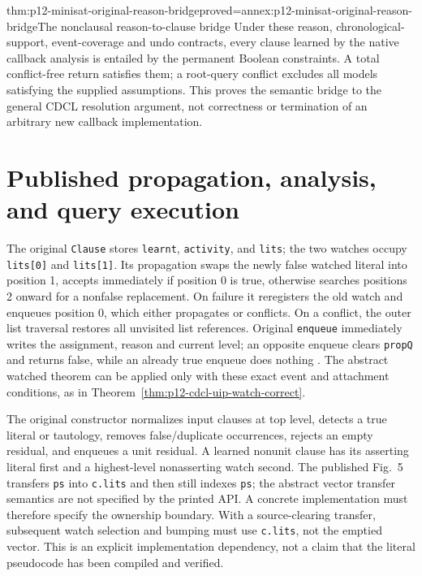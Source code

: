 \begin{hbtheorem}{thm:p12-minisat-original-reason-bridge}{proved=annex:p12-minisat-original-reason-bridge}{The nonclausal reason-to-clause bridge}
Under these reason, chronological-support, event-coverage and undo contracts,
every clause learned by the native callback analysis is entailed by the
permanent Boolean constraints.  A total conflict-free return satisfies them;
a root-query conflict excludes all models satisfying the supplied assumptions.
This proves the semantic bridge to the general CDCL resolution argument,
not correctness or termination of an arbitrary new callback implementation.
\end{hbtheorem}

\section{Published propagation, analysis, and query execution}

The original \texttt{Clause} stores \texttt{learnt}, \texttt{activity}, and
\texttt{lits}; the two watches occupy \texttt{lits[0]} and \texttt{lits[1]}.
Its propagation swaps the newly false watched literal into position 1,
accepts immediately if position 0 is true, otherwise searches positions 2
onward for a nonfalse replacement.  On failure it reregisters the old watch
and enqueues position 0, which either propagates or conflicts.  On a conflict,
the outer list traversal restores all unvisited list references.  Original
\texttt{enqueue} immediately writes the assignment, reason and current level;
an opposite enqueue clears \texttt{propQ} and returns false, while an already
true enqueue does nothing \cite[Figs.~4, 6]{EenSorensson2003}.
The abstract watched theorem can be applied only with these exact event and
attachment conditions, as in Theorem~\ref{thm:p12-cdcl-uip-watch-correct}.

The original constructor normalizes input clauses at top level, detects a
true literal or tautology, removes false/duplicate occurrences, rejects an
empty residual, and enqueues a unit residual.  A learned nonunit clause has
its asserting literal first and a highest-level nonasserting watch second.
The published Fig.~5 transfers \texttt{ps} into \texttt{c.lits} and then
still indexes \texttt{ps}; the abstract vector transfer semantics are not
specified by the printed API.  A concrete implementation must therefore
specify the ownership boundary.  With a source-clearing transfer, subsequent
watch selection and bumping must use \texttt{c.lits}, not the emptied vector.
This is an explicit implementation dependency, not a claim that the literal
pseudocode has been compiled and verified.

